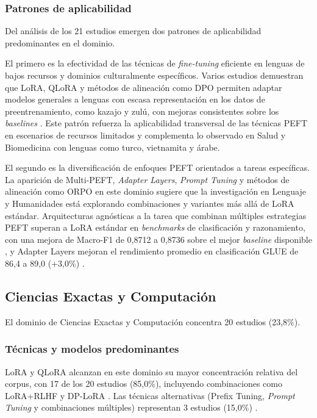\subsubsection{Patrones de aplicabilidad}

Del análisis de los 21 estudios emergen dos patrones de aplicabilidad predominantes en el dominio.

El primero es la efectividad de las técnicas de \textit{fine-tuning} eficiente en lenguas de bajos recursos y dominios culturalmente específicos. Varios estudios demuestran que LoRA, QLoRA y métodos de alineación como DPO permiten adaptar modelos generales a lenguas con escasa representación en los datos de preentrenamiento, como kazajo y zulú, con mejoras consistentes sobre los \textit{baselines} \parencite{kadyrbek2025dpo, khoboko2025ft}. Este patrón refuerza la aplicabilidad transversal de las técnicas PEFT en escenarios de recursos limitados y complementa lo observado en Salud y Biomedicina con lenguas como turco, vietnamita y árabe.

El segundo es la diversificación de enfoques PEFT orientados a tareas específicas. La aparición de Multi-PEFT, \textit{Adapter Layers}, \textit{Prompt Tuning} y métodos de alineación como ORPO en este dominio sugiere que la investigación en Lenguaje y Humanidades está explorando combinaciones y variantes más allá de LoRA estándar. Arquitecturas agnósticas a la tarea que combinan múltiples estrategias PEFT superan a LoRA estándar en \textit{benchmarks} de clasificación y razonamiento, con una mejora de Macro-F1 de 0,8712 a 0,8736 sobre el mejor \textit{baseline} disponible \parencite{jia2025agnostic}, y Adapter Layers mejoran el rendimiento promedio en clasificación GLUE de 86,4 a 89,0 (+3,0\%) \parencite{chen2025adaptforever}.

\subsection{Ciencias Exactas y Computación}

El dominio de Ciencias Exactas y Computación concentra 20 estudios (23,8\%).

\subsubsection{Técnicas y modelos predominantes}

LoRA y QLoRA alcanzan en este dominio su mayor concentración relativa del corpus, con 17 de los 20 estudios (85,0\%), incluyendo combinaciones como LoRA+RLHF \parencite{gorbatovski2024qa} y DP-LoRA \parencite{liu2025federated}. Las técnicas alternativas (Prefix Tuning, \textit{Prompt Tuning} y combinaciones múltiples) representan 3 estudios (15,0\%) \parencite{jung2025prefix, prottasha2024peft, zou2025peft}.


